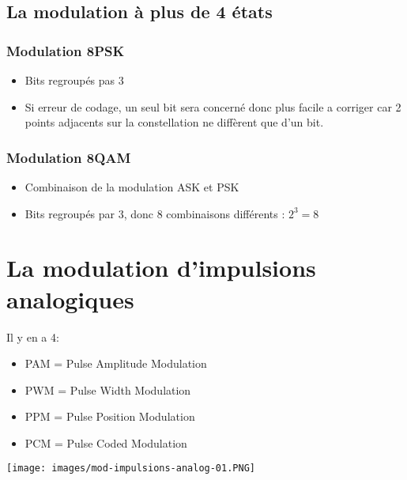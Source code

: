 \documentclass[a4paper]{article}
\begin{document}
\subsection{La modulation à plus de 4 états}
\subsubsection{Modulation 8PSK}
\begin{itemize}
    \item Bits regroupés pas 3
    \item Si erreur de codage, un seul bit sera concerné donc plus facile a corriger car 2 points adjacents sur la constellation ne diffèrent que d'un bit.
\end{itemize}

\subsubsection{Modulation 8QAM}
\begin{itemize}
    \item Combinaison de la modulation ASK et PSK
    \item Bits regroupés par 3, donc 8 combinaisons différents : $2^3 = 8$
\end{itemize}









\section{La modulation d'impulsions analogiques} %



Il y en a 4:
\begin{itemize}
    \item PAM = Pulse Amplitude Modulation
    \item PWM = Pulse Width Modulation
    \item PPM = Pulse Position Modulation
    \item PCM = Pulse Coded Modulation
\end{itemize}
\begin{center}
    \texttt{[image: images/mod-impulsions-analog-01.PNG]}
\end{center}
\end{document}
